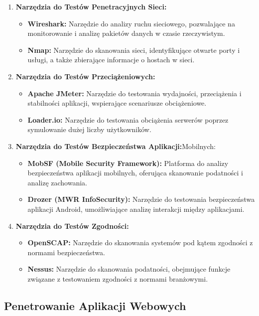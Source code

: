 \documentclass[12pt,twoside]{article}
\begin{document}
\begin{enumerate}
\begin{itemize}
    \end{itemize}
    \item \textbf{Narzędzia do Testów Penetracyjnych Sieci:}
    \begin{itemize}
        \item \textbf{Wireshark:} Narzędzie do analizy ruchu sieciowego, pozwalające na monitorowanie i analizę pakietów danych w czasie rzeczywistym.
        \item \textbf{Nmap: } Narzędzie do skanowania sieci, identyfikujące otwarte porty i usługi, a także zbierające informacje o hostach w sieci.
    \end{itemize}
    \item \textbf{Narzędzia do Testów Przeciążeniowych:}
    \begin{itemize}
        \item \textbf{Apache JMeter:} Narzędzie do testowania wydajności, przeciążenia i stabilności aplikacji, wspierające scenariusze obciążeniowe.
        \item \textbf{Loader.io: } Narzędzie do testowania obciążenia serwerów poprzez symulowanie dużej liczby użytkowników.
    \end{itemize}
    \item \textbf{Narzędzia do Testów Bezpieczeństwa Aplikacji:}Mobilnych:
    \begin{itemize}
        \item \textbf{MobSF (Mobile Security Framework):} Platforma do analizy bezpieczeństwa aplikacji mobilnych, oferująca skanowanie podatności i analizę zachowania.
        \item \textbf{Drozer (MWR InfoSecurity):} Narzędzie do testowania bezpieczeństwa aplikacji Android, umożliwiające analizę interakcji między aplikacjami.
    \end{itemize}
    \item \textbf{Narzędzia do Testów Zgodności:}
    \begin{itemize}
        \item \textbf{OpenSCAP:} Narzędzie do skanowania systemów pod kątem zgodności z normami bezpieczeństwa.
        \item \textbf{Nessus:} Narzędzie do skanowania podatności, obejmujące funkcje związane z testowaniem zgodności z normami branżowymi.
    \end{itemize}

\end{enumerate}
\subsection{Penetrowanie Aplikacji Webowych}
\end{document}
